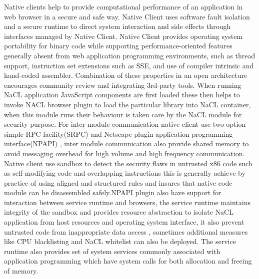 \documentclass[23pt]{article}
\begin{document}
{\Large Native clients help to provide computational performance of an application in web browser in a secure and safe way. Native Client uses software fault isolation and a secure runtime to direct system interaction and side effects through interfaces managed by Native Client. Native Client provides operating system portability for binary code while supporting performance-oriented features generally absent from web application programming environments, such as thread support, instruction set extensions such as SSE, and use of compiler intrinsic and hand-coded assembler. Combination of these properties in an open architecture encourages community review and integrating 3rd-party tools. When running NaCL application JavaScript components are first loaded these then helps to invoke NACL browser plugin to load the particular library into NaCL container, when this module runs their behaviour is taken care by the NaCL module for security purpose. For inter module communication native client use two option simple RPC facility(SRPC) and Netscape plugin application programming interface(NPAPI) , inter module communication also provide shared memory to avoid messaging overhead for high volume and high frequency communication. Native client use sandbox to detect the security flaws in untrusted x86 code such as self-modifying code and overlapping instructions this is generally achieve by practice of using aligned and structured rules and insures that native code module can be disassembled safely.NPAPI plugin also have support for interaction between service runtime and browsers, the service runtime maintains integrity of the sandbox and provides resource abstraction to isolate NaCL application from host resources and operating system interface, it also prevent untrusted code from inappropriate data access , sometimes additional measures like CPU blacklisting and NaCL whitelist can also be deployed. The service runtime also provides set of system services commonly associated with application programming which have system calls for both allocation and freeing of  memory. \cite{naclback}  \\ \\
}
\end{document}

